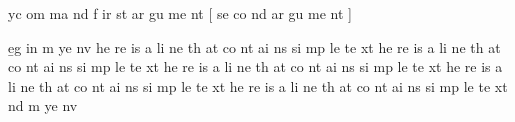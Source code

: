 \m
yc
om
ma
nd
	{f
		ir
		st
		ar
		gu
		me
		nt
	}[
		se
		co
		nd
		ar
		gu
		me
		nt
	]

\b
eg
in
	{m
		ye
		nv
	}
he
re
is
a
li
ne
th
at
co
nt
ai
ns
si
mp
le
te
xt
he
re
is
a
li
ne
th
at
co
nt
ai
ns
si
mp
le
te
xt
he
re
is
a
li
ne
th
at
co
nt
ai
ns
si
mp
le
te
xt
he
re
is
a
li
ne
th
at
co
nt
ai
ns
si
mp
le
te
xt
he
re
is
a
li
ne
th
at
co
nt
ai
ns
si
mp
le
te
xt
\e
nd
	{m
		ye
		nv
	}
